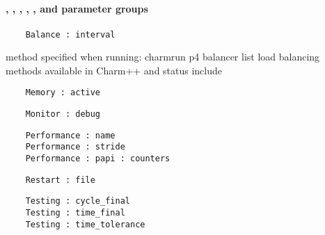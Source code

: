 \NEWSEC

\subsection{\ssParamOther}

\begin{frame}[fragile,label=ss-param-other] 
\secframetitle{\ssParamOther}
\framesubtitle{,
               ,
               ,
               ,
               ,
               and  parameter groups}


\begin{verbatim}
    Balance : interval
\end{verbatim}

    method specified when running: charmrun p4 balancer
    list load balancing methods available in Charm++ and status
    include 

\begin{verbatim}
    Memory : active
\end{verbatim}

\begin{verbatim}
    Monitor : debug
\end{verbatim}

\begin{verbatim}
    Performance : name
    Performance : stride
    Performance : papi : counters
\end{verbatim}

\begin{verbatim}
    Restart : file
\end{verbatim}

\begin{verbatim}
    Testing : cycle_final
    Testing : time_final
    Testing : time_tolerance
\end{verbatim}

\end{frame}

